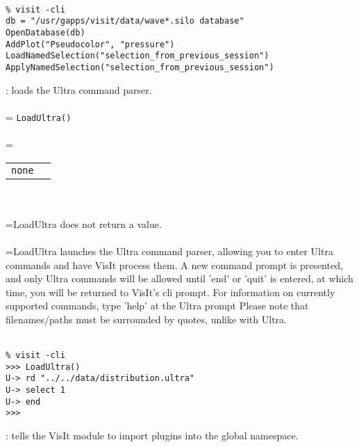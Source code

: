 \documentclass[10pt,a4paper]{report}
\begin{document}
\\[-6mm]
\begin{verbatim}% visit -cli
db = "/usr/gapps/visit/data/wave*.silo database"
OpenDatabase(db)
AddPlot("Pseudocolor", "pressure")
LoadNamedSelection("selection_from_previous_session")
ApplyNamedSelection("selection_from_previous_session")
\end{verbatim}
\newpage


{}
: loads the Ultra command parser.\\[-3mm]

 \\ 
\hangindent=\parindent 
\verb!LoadUltra()!\\ [-3mm]

 \\ 
\hangindent=\parindent 
\begin{tabular}{ll}
\verb!none! &  \\
\end{tabular} \\[-2mm]


 \\ 
\hangindent=\parindent LoadUltra does not return a value. \\[-3mm] 

 \\ 
\hangindent=\parindent LoadUltra launches the Ultra command parser, allowing you to enter Ultra commands and have VisIt process them.  A new command prompt is presented, and only Ultra commands will be allowed until 'end' or 'quit' is entered, at which time, you will be returned to VisIt's cli prompt.  For information on currently supported commands, type 'help' at the Ultra prompt Please note that filenames/paths must be surrounded by quotes, unlike with Ultra. \\[-3mm] 

\\[-6mm]
\begin{verbatim}% visit -cli
>>> LoadUltra()
U-> rd "../../data/distribution.ultra"
U-> select 1
U-> end
>>>
\end{verbatim}
\newpage


{}
: tells the VisIt module to import plugins into the global namespace.\\[-3mm]
\end{document}
